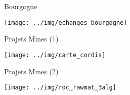 \documentclass[11pt]{beamer}
\begin{document}
\begin{frame}{Bourgogne}

\texttt{[image: ../img/echanges\_bourgogne]}

\end{frame}

\begin{frame}{Projets Mines (1)}
\begin{center}
\texttt{[image: ../img/carte\_cordis]}
\end{center}
\end{frame}

\begin{frame}{Projets Mines (2)}
\begin{center}
\texttt{[image: ../img/roc\_rawmat\_3alg]}
\end{center}
\end{frame}
\end{document}
